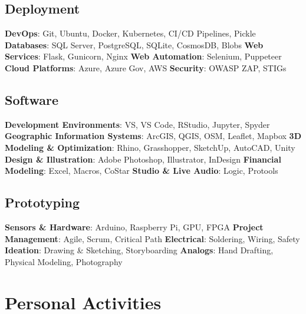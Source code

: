 \documentclass{article}
\begin{document}
    \subsection*{Deployment}
        \textbf{DevOps}: Git, Ubuntu, Docker, Kubernetes, CI/CD Pipelines, Pickle\newline
        \textbf{Databases}: SQL Server, PostgreSQL, SQLite, CosmosDB, Blobs\newline
        \textbf{Web Services}: Flask, Gunicorn, Nginx\newline
        \textbf{Web Automation}: Selenium, Puppeteer\newline
        \textbf{Cloud Platforms}: Azure, Azure Gov, AWS\newline
        \textbf{Security}: OWASP ZAP, STIGs
    \subsection*{Software}
        \textbf{Development Environments}: VS, VS Code, RStudio, Jupyter, Spyder\newline
        \textbf{Geographic Information Systems}: ArcGIS, QGIS, OSM, Leaflet, Mapbox\newline
        \textbf{3D Modeling \& Optimization}: Rhino, Grasshopper, SketchUp, AutoCAD, Unity\newline
        \textbf{Design \& Illustration}: Adobe Photoshop, Illustrator, InDesign\newline
        \textbf{Financial Modeling}: Excel, Macros, CoStar\newline
        \textbf{Studio \& Live Audio}: Logic, Protools
    \subsection*{Prototyping}
        \textbf{Sensors \& Hardware}: Arduino, Raspberry Pi, GPU, FPGA\newline
        \textbf{Project Management}: Agile, Scrum, Critical Path\newline
        \textbf{Electrical}: Soldering, Wiring, Safety\newline
        \textbf{Ideation}: Drawing \& Sketching, Storyboarding\newline
        \textbf{Analogs}: Hand Drafting, Physical Modeling, Photography
    \section*{Personal Activities}
\end{document}
